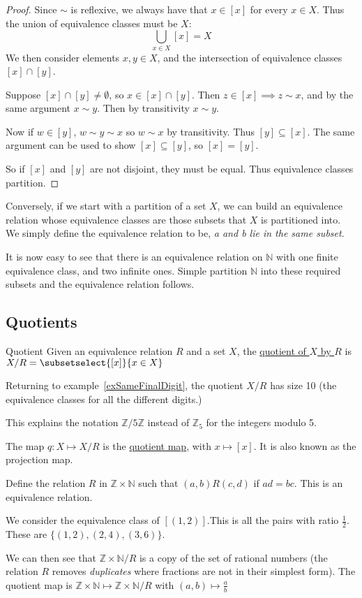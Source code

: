 \documentclass[../Main.tex]{subfiles}
\begin{document}
\begin{proof}
    Since $\sim$ is reflexive, we always have that $x \in [x]$ for every $x \in X$. Thus the union of equivalence classes must be $X$:
    \begin{equation*}
        \bigcup_{x \in X} [x] = X
    \end{equation*}
    We then consider elements $x, y \in X$, and the intersection of equivalence classes $[x] \cap [y]$.\par
    Suppose $[x] \cap [y] \neq \emptyset$, so $x \in [x] \cap [y]$. Then $z \in [x] \implies z \sim x$, and by the same argument $x \sim y$. Then by transitivity $x \sim y$.\par
    Now if $w \in [y]$, $w \sim y \sim x$ so $w \sim x$ by transitivity. Thus $[y] \subseteq [x]$. The same argument can be used to show $[x] \subseteq [y]$, so $[x] = [y]$.\par
    So if $[x]$ and $[y]$ are not disjoint, they must be equal. Thus equivalence classes partition.
\end{proof}
Conversely, if we start with a partition of a set $X$, we can build an equivalence relation whose equivalence classes are those subsets that $X$ is partitioned into. We simply define the equivalence relation to be, \textit{a and b lie in the same subset}.\par
It is now easy to see that there is an equivalence relation on $\mathbb{N}$ with one finite equivalence class, and two infinite ones. Simple partition $\mathbb{N}$ into these required subsets and the equivalence relation follows.
\subsection{Quotients}
\begin{definition}{Quotient}
    Given an equivalence relation $R$ and a set $X$, the \underline{quotient of $X$ by $R$} is $X / R = \subsetselect{[x]}{x \in X}$
\end{definition}
Returning to example~\ref{exSameFinalDigit}, the quotient $X / R$ has size 10 (the equivalence classes for all the different digits.)\par %
This explains the notation $\mathbb{Z} / 5\mathbb{Z}$ instead of $\mathbb{Z}_5$ for the integers modulo 5.\par
The map $q : X \mapsto X / R$ is the \underline{quotient map}, with $x \mapsto [x]$. It is also known as the projection map.
\begin{example}
    Define the relation $R$ in $\mathbb{Z} \times \mathbb{N}$ such that $(a, b)R(c, d)$ if $ad = bc$. This is an equivalence relation.\par
    We consider the equivalence class of $[(1, 2)]$.This is all the pairs with ratio $\frac{1}{2}$. These are $\{(1, 2), (2, 4), (3, 6)\}$.\par
    We can then see that $\mathbb{Z} \times \mathbb N / R$ is a copy of the set of rational numbers (the relation $R$ removes \textit{duplicates} where fractions are not in their simplest form). The quotient map is $\mathbb{Z} \times \mathbb{N} \mapsto \mathbb{Z} \times \mathbb{N} / R$ with $(a, b) \mapsto \frac{a}{b}$
\end{example}
\end{document}
